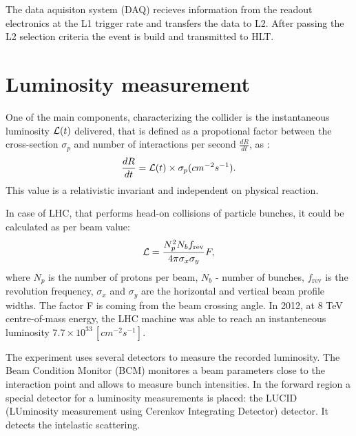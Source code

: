 The data aquisiton system (DAQ) recieves information from the readout electronics at the L1 trigger rate and  transfers the data to L2. After passing the L2 selection criteria the event is build and transmitted to HLT.

\section{Luminosity measurement}

One of the main components, characterizing the collider is the instantaneous luminosity $\mathcal{L}(t)$ delivered, that is defined as a propotional factor between the cross-section $\sigma_p$ and number of interactions per second $\frac{dR}{dt}$, as :
\begin{equation}
\frac{dR}{dt}= \mathcal{L}(t) \times \sigma_p (cm^{-2}s^{-1}).
\end{equation}
This value is a relativistic invariant and independent on physical reaction.

In case of LHC, that performs  head-on collisions of particle bunches, it could be calculated as per beam value:
\begin{equation}
\mathcal{L} = \frac{N_p^2 N_b f_{\textrm{rev}}}{4\pi  \sigma_x \sigma_y}F , 
\end{equation}
where $N_{p}$ is the number of protons per beam, $N_b$ - number of bunches, $f_{\textrm{rev}}$ is the revolution frequency, $\sigma_x$ and $\sigma_y$ are the horizontal and vertical beam profile widths. The factor F is coming from the beam crossing angle. In 2012, at 8 TeV centre-of-mass energy, the LHC machine was able to reach an instanteneous luminosity $7.7\times10^{33}\, [cm^{-2}s^{-1}]$.  

The \atlas experiment uses several detectors to measure the recorded luminosity. The Beam Condition Monitor (BCM) monitores a beam parameters close to the interaction point and allows to measure bunch intensities. In the forward region a special detector for a luminosity measurements is placed: the LUCID (LUminosity measurement using Cerenkov Integrating Detector) detector. It detects the intelastic scattering.